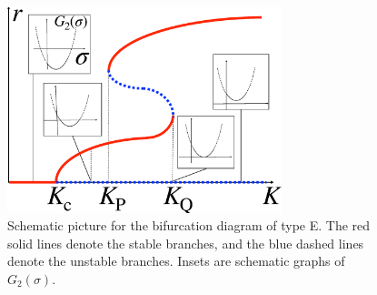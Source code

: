 \begin{figure}[htbp]
\begin{center}
  \includegraphics[width=8cm]{figs/G2_sigma.eps}
\end{center}
\caption{
  Schematic picture for the bifurcation diagram of type E.
  The red solid lines denote the stable branches,
  and the blue dashed lines denote the unstable branches.
  Insets are schematic graphs of $G_{2}(\sigma)$.  
  }
  \label{fig:schematic2}
\end{figure}




